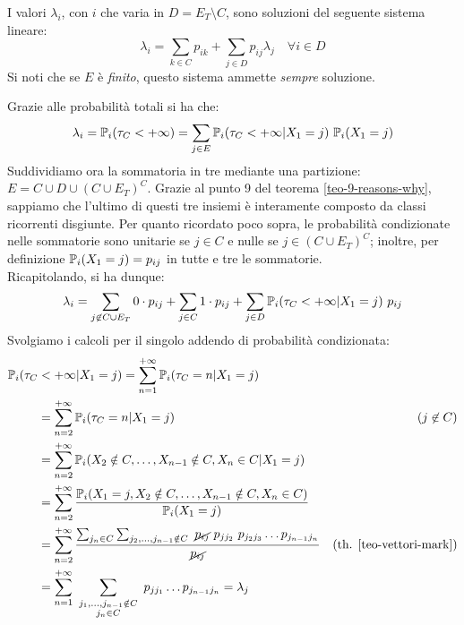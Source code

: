 \begin{prop}\label{sistema-prob-assorb}
	I valori $\lambda_i$, con $i$ che varia in $D=E_T \setminus C$, sono soluzioni del seguente sistema lineare:
	$$ \lambda_i = \sum_{k \in C} p_{ik} + \sum_{j \in D} p_{ij} \lambda_j \quad \forall i \in D $$
	Si noti che se $E$ è \emph{finito}, questo sistema ammette \emph{sempre} soluzione.
\end{prop}
\begin{dimo}
	Grazie alle probabilità totali si ha che:
	$$\lambda_i = \mathbb P_i(\tau_C < +\infty) = \sum_{j \in E} \mathbb P_i(\tau_C < +\infty | X_1=j) \ \mathbb P_i(X_1=j)$$
	Suddividiamo ora la sommatoria in tre mediante una partizione: $E = C \cup D \cup (C \cup E_T)^C$.
	Grazie al punto 9 del teorema \ref{teo-9-reasons-why}, sappiamo che l'ultimo di questi tre insiemi è interamente composto da classi ricorrenti disgiunte.
	Per quanto ricordato poco sopra, le probabilità condizionate nelle sommatorie sono unitarie se $j \in C$ e nulle se $j \in (C \cup E_T)^C$;
	 inoltre, per definizione $\mathbb P_i(X_1=j) = p_{ij}$ in tutte e tre le sommatorie. \\
	Ricapitolando, si ha dunque:
	$$\lambda_i = \sum_{j \not\in C \cup E_T} 0 \cdot p_{ij} + \sum_{j \in C} 1 \cdot p_{ij}
	+ \sum_{j \in D}  \mathbb P_i(\tau_C < +\infty | X_1=j) \ p_{ij}$$
	Svolgiamo i calcoli per il singolo addendo di probabilità condizionata:
	\begin{align*}
		\PP_i(\tau_C &< +\infty | X_1=j) = \sum_{n=1}^{+\infty} \PP_i(\tau_C=n | X_1=j) \\
		&= \sum_{n=2}^{+\infty} \PP_i(\tau_C=n | X_1=j) &(j \not\in C)\\
		&= \sum_{n=2}^{+\infty} \PP_i(X_2 \notin C,\dots,X_{n-1} \notin C, X_n \in C | X_1=j) \\
		&= \sum_{n=2}^{+\infty} \frac{\PP_i(X_1=j, X_2 \notin C,\dots,X_{n-1} \notin C, X_n \in C)}{\PP_i(X_1=j)} \\
		&= \sum_{n=2}^{+\infty} \frac{ \sum_{j_n \in C} \sum_{j_2,\dots,j_{n-1} \notin C} \ \cancel{p_{ij}} \ p_{jj_2} \ p_{j_2 j_3} \dots p_{j_{n-1} j_n} }{\cancel{p_{ij}}} &\text{(th. \ref{teo-vettori-mark})}\\
		&= \sum_{n=1}^{+\infty} \ \sum_{\substack{j_1,\dots,j_{n-1} \notin C\\j_n \in C}} \ p_{j j_1} \dots p_{j_{n-1} j_n}
		= \lambda_j

\end{align*}
\end{dimo}

